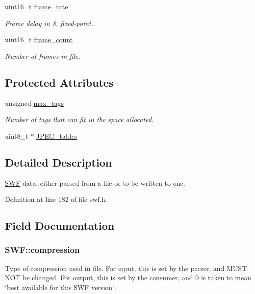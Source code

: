 \begin{DoxyCompactItemize}
uint16\-\_\-t \hyperlink{struct_s_w_f_aa2c564fe1b703896a7970287cc0a131a}{frame\-\_\-rate}
\begin{DoxyCompactList}\small\item\em Frame delay in 8. fixed-\/point. \end{DoxyCompactList}\item 
uint16\-\_\-t \hyperlink{struct_s_w_f_aad31257e9575ac95fdfdbaaf3505d65b}{frame\-\_\-count}
\begin{DoxyCompactList}\small\item\em Number of frames in file. \end{DoxyCompactList}\end{DoxyCompactItemize}
\subsection*{Protected Attributes}
\begin{DoxyCompactItemize}
\item 
unsigned \hyperlink{struct_s_w_f_a341ef0cf50f79cad21ae0db9fe483dc1}{max\-\_\-tags}
\begin{DoxyCompactList}\small\item\em Number of tags that can fit in the space allocated. \end{DoxyCompactList}\item 
uint8\-\_\-t $\ast$ \hyperlink{struct_s_w_f_ae63eda75022e0100a17e78b200d607a4}{J\-P\-E\-G\-\_\-tables}
\end{DoxyCompactItemize}


\subsection{Detailed Description}
\hyperlink{struct_s_w_f}{S\-W\-F} data, either parsed from a file or to be written to one. 

Definition at line 182 of file swf.\-h.



\subsection{Field Documentation}
\hypertarget{struct_s_w_f_a6431142bed21f16383a18d8a3f8a19d1}{
\subsubsection[{compression}]{ S\-W\-F\-::compression}}\label{struct_s_w_f_a6431142bed21f16383a18d8a3f8a19d1}
Type of compression used in file. For input, this is set by the parser, and M\-U\-S\-T N\-O\-T be changed. For output, this is set by the consumer, and 0 is taken to mean \char`\"{}best available for this S\-W\-F version\char`\"{}. 

